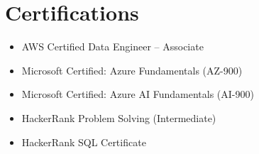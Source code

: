 \documentclass[11pt,a4paper]{article}
\begin{document}
\section*{Certifications}
\begin{itemize}
    \item AWS Certified Data Engineer -- Associate
    \item Microsoft Certified: Azure Fundamentals (AZ-900)
    \item Microsoft Certified: Azure AI Fundamentals (AI-900)
    \item HackerRank Problem Solving (Intermediate)
    \item HackerRank SQL Certificate
\end{itemize}
\end{document}
